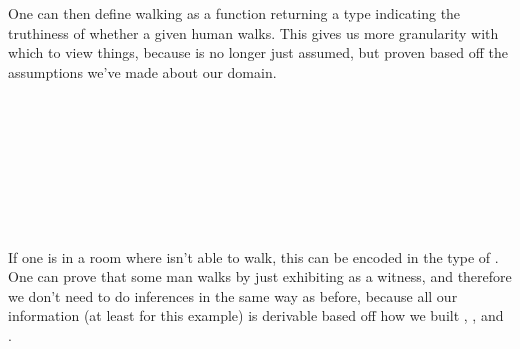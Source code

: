 One can then define walking as a function returning a type indicating the
truthiness of whether a given human walks. This gives us more granularity with
which to view things, because  is no longer just assumed, but
proven based off the assumptions we've made about our domain.

\begin{code}%
\>[0]\AgdaSpace{}%
\AgdaSymbol{:}\AgdaSpace{}%
\AgdaSpace{}%
\AgdaSpace{}%
\<%
\\
\>[0]\AgdaSpace{}%
\AgdaSymbol{(}\AgdaSpace{}%
\AgdaSymbol{)}\AgdaSpace{}%
\AgdaSymbol{=}\AgdaSpace{}%
\<%
\\
\>[0]\AgdaSpace{}%
\AgdaSymbol{(}\AgdaSpace{}%
\AgdaSymbol{)}\AgdaSpace{}%
\AgdaSymbol{=}\AgdaSpace{}%
\<%
\\
\>[0]\AgdaSpace{}%
\AgdaSymbol{(}\AgdaSpace{}%
\AgdaSymbol{)}\AgdaSpace{}%
\AgdaSymbol{=}\AgdaSpace{}%
\<%
\\
%
\\[\AgdaEmptyExtraSkip]%
\>[0]\AgdaSpace{}%
\AgdaSymbol{:}\AgdaSpace{}%
\AgdaSpace{}%
\AgdaSpace{}%
\AgdaSpace{}%
\AgdaSpace{}%
\AgdaSpace{}%
\AgdaSpace{}%
\AgdaSymbol{(}\AgdaSpace{}%
\AgdaSymbol{)}\<%
\\
\>[0]\AgdaSpace{}%
\AgdaSpace{}%
\AgdaSymbol{=}\AgdaSpace{}%
\<%
\\
\>[0]\AgdaSpace{}%
\AgdaSpace{}%
\AgdaSymbol{=}\AgdaSpace{}%
\<%
\end{code}

If one is in a room where  isn't able to walk, this can be encoded in
the type of . One can prove that some man walks by just exhibiting
 as a witness, and therefore we don't need to do inferences in the
same way as before, because all our information (at least for this example) is
derivable based off how we built , , and .

